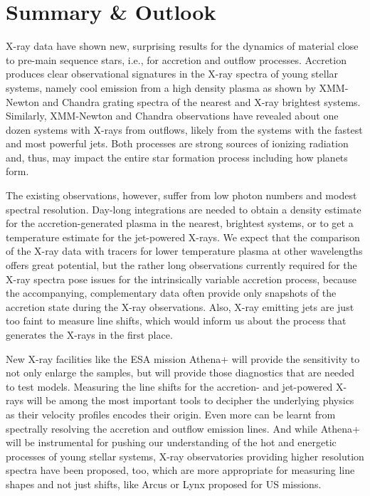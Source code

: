\documentclass[graybox, nosecnum]{svmult}
\begin{document}
\section{Summary \& Outlook}

X-ray data have shown new, surprising results for the dynamics of material close to pre-main sequence stars, i.e., for accretion and outflow processes. Accretion produces clear observational signatures in the X-ray spectra of young stellar systems, namely cool emission from a high density plasma as shown by XMM-Newton and Chandra grating spectra of the nearest and X-ray brightest systems. Similarly, XMM-Newton and Chandra observations have revealed about one dozen systems with  X-rays from outflows, likely from the systems with the fastest and most powerful jets.
Both processes are strong sources of ionizing radiation and, thus, may impact the entire star formation process including how planets form.

The existing observations, however, suffer from low photon numbers and modest spectral resolution. Day-long integrations are needed to obtain a density estimate for the accretion-generated plasma in the nearest, brightest systems, or to get a temperature estimate for the jet-powered X-rays. We expect that the comparison of the X-ray data with tracers for lower temperature plasma at other wavelengths offers great potential, but the rather long observations currently required for the X-ray spectra pose issues for the intrinsically variable accretion process, because the accompanying, complementary data often provide only snapshots of the accretion state during the X-ray observations. Also, X-ray emitting jets are just too faint to measure line shifts, which would inform us about the process that generates the X-rays in the first place. 

New X-ray facilities like the ESA mission Athena+ will provide the sensitivity to not only enlarge the samples, but will provide those diagnostics that are needed to test models. Measuring the line shifts for the accretion- and jet-powered X-rays will be among the most important tools to decipher the underlying physics as their velocity profiles 
encodes their origin. Even more can be learnt from spectrally resolving the accretion and outflow emission lines. And while Athena+ will be instrumental for pushing our understanding of the hot and energetic processes of young stellar systems, X-ray observatories providing higher resolution spectra have been proposed, too, which are more appropriate for measuring line shapes and not just shifts, like Arcus or Lynx proposed for US missions.
\end{document}
